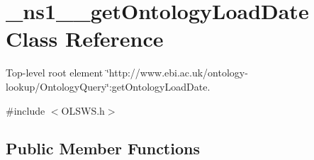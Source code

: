 \hypertarget{class__ns1____getOntologyLoadDate}{
\section{\_\-ns1\_\-\_\-getOntologyLoadDate Class Reference}
\label{class__ns1____getOntologyLoadDate}
}


Top-\/level root element \char`\"{}http://www.ebi.ac.uk/ontology-\/lookup/OntologyQuery\char`\"{}:getOntologyLoadDate.  




{\ttfamily \#include $<$OLSWS.h$>$}

\subsection*{Public Member Functions}

